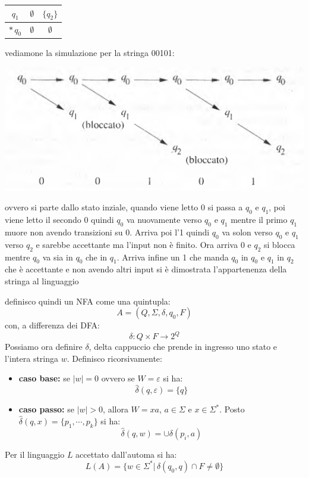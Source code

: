 \begin{example}
\begin{center}
\begin{tabular}{c|c|c}
			\hline
			$q_1$       & $\emptyset$   & $\{q_2\}$   \\
			\hline
			$*\, q_0$   & $\emptyset$   & $\emptyset$
		\end{tabular}
	\end{center}
	vediamone la simulazione per la stringa 00101:
	\begin{center}
		\includegraphics[scale=0.7]{img/nfa.png}
	\end{center}
	ovvero si parte dallo stato inziale, quando viene letto 0 si passa a $q_0$ e $q_1$, poi viene letto il secondo 0 quindi $q_0$ va nuovamente verso $q_0$ e $q_1$ mentre il primo $q_1$ muore non avendo transizioni su 0. Arriva poi l'1 quindi $q_0$ va solon verso $q_0$ e $q_1$ verso $q_2$ e sarebbe accettante ma l'input non è finito. Ora arriva 0 e $q_2$ si blocca mentre $q_0$ va sia in $q_0$ che in $q_1$. Arriva infine un 1 che manda $q_0$ in $q_0$ e $q_1$ in $q_2$ che è accettante e non avendo altri input si è dimostrata l'appartenenza della stringa al linguaggio
\end{example}
definisco quindi un NFA come una quintupla:
$$A=(Q,\Sigma,\delta,q_0,F)$$
con, a differenza dei DFA:
$$\delta:Q\times F\to 2^Q$$
Possiamo ora definire {$\delta$}, delta cappuccio che prende in ingresso uno stato e l'intera stringa $w$. Definisco ricorsivamente:
\begin{itemize}
	\item \textbf{caso base:} se $|w|=0$ ovvero se $W=\varepsilon$ si ha:
	      $$\hat{\delta}(q,\varepsilon)=\{q\}$$
	\item \textbf{caso passo:} se $|w|>0$, allora $W=xa$, $a\in\Sigma$ e $x\in\Sigma^*$. Posto $\hat{\delta}(q,x)=\{p_1,\cdots,p_k\}$ si ha:
	      $$\hat{\delta}(q,w)=\cup \delta(p_i,a)$$
\end{itemize}
Per il linguaggio $L$ accettato dall'automa si ha:
$$L(A)=\{w\in \Sigma^*|\, \hat{\delta}(q_0,q)\cap F\neq \emptyset\}$$

